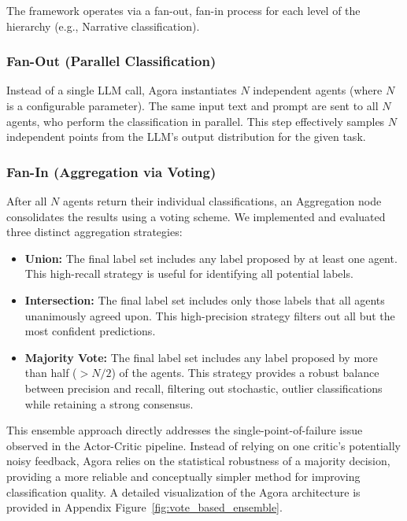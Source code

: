 The framework operates via a fan-out, fan-in process for each level of the hierarchy (e.g., Narrative classification).

\subsubsection{Fan-Out (Parallel Classification)}

Instead of a single LLM call, Agora instantiates $N$ independent agents (where $N$ is a configurable parameter). The same input text and prompt are sent to all $N$ agents, who perform the classification in parallel. This step effectively samples $N$ independent points from the LLM's output distribution for the given task.

\subsubsection{Fan-In (Aggregation via Voting)}

After all $N$ agents return their individual classifications, an Aggregation node consolidates the results using a voting scheme. We implemented and evaluated three distinct aggregation strategies:

\begin{itemize}
\item \textbf{Union:} The final label set includes any label proposed by at least one agent. This high-recall strategy is useful for identifying all potential labels.

\item \textbf{Intersection:} The final label set includes only those labels that all agents unanimously agreed upon. This high-precision strategy filters out all but the most confident predictions.

\item \textbf{Majority Vote:} The final label set includes any label proposed by more than half ($> N/2$) of the agents. This strategy provides a robust balance between precision and recall, filtering out stochastic, outlier classifications while retaining a strong consensus.
\end{itemize}

This ensemble approach directly addresses the single-point-of-failure issue observed in the Actor-Critic pipeline. Instead of relying on one critic's potentially noisy feedback, Agora relies on the statistical robustness of a majority decision, providing a more reliable and conceptually simpler method for improving classification quality. A detailed visualization of the Agora architecture is provided in Appendix Figure~\ref{fig:vote_based_ensemble}.
